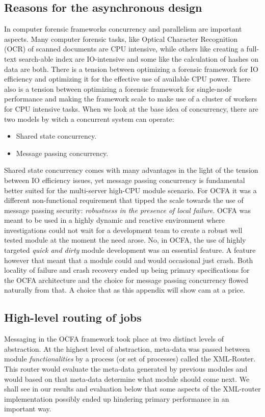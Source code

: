 \subsection{Reasons for the asynchronous design}
In computer forensic frameworks concurrency and parallelism are important aspects. Many computer forensic tasks, like Optical Character Recognition (OCR) of scanned documents are CPU intensive, while others like creating a full-text search-able index are IO-intensive and some like the calculation of hashes on data are both. There is a tension between optimizing a forensic framework for IO efficiency and optimizing it for the effective use of available CPU power. There also is a tension between optimizing a forensic framework for single-node performance and making the framework scale to make use of a cluster of workers for CPU intensive tasks. When we look at the base idea of concurrency, there are two models by witch a concurrent system can operate: 
\begin{itemize}
\item Shared state concurrency.
\item Message passing concurrency.
\end{itemize}
Shared state concurrency comes with many advantages in the light of the tension between IO efficiency issues, yet message passing concurrency is fundamental better suited for the multi-server high-CPU module scenario. For OCFA it was a different non-functional requirement that tipped the scale towards the use of message passing security: \emph{robustness in the presence of local failure}. OCFA was meant to be used in
a highly dynamic and reactive environment where investigations could not wait for a development team to create a robust well tested module at the moment the need arose. No, in OCFA, the use of highly targeted \emph{quick and dirty} module development was an essential feature. A feature however that meant that a module could and would occasional just crash. Both locality of failure and crash recovery ended up being primary specifications for the OCFA architecture and the choice for message passing concurrency flowed naturally from that. A choice that as this appendix will show cam at a price.
\subsection{High-level routing of jobs}
Messaging in the OCFA framework took place at two distinct levels of abstraction. At the highest level of abstraction, meta-data was passed between module \emph{functionalities} by a process (or set of processes) called the XML-Router. This router would evaluate the meta-data generated by previous modules and would based on that meta-data determine what module should come next. We shall see in our results and evaluation below that some aspects of the XML-router implementation possibly ended up hindering primary performance in an important way.
